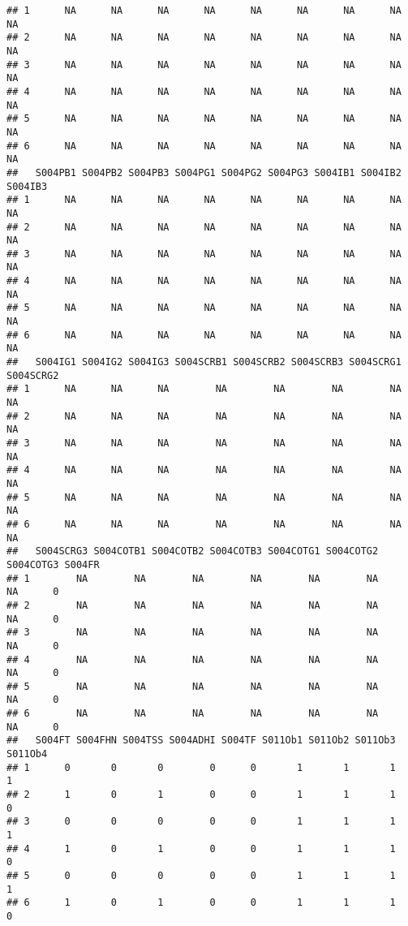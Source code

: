 \documentclass[
]{article}
\begin{document}
\begin{verbatim}
## 1      NA      NA      NA      NA      NA      NA      NA      NA      NA
## 2      NA      NA      NA      NA      NA      NA      NA      NA      NA
## 3      NA      NA      NA      NA      NA      NA      NA      NA      NA
## 4      NA      NA      NA      NA      NA      NA      NA      NA      NA
## 5      NA      NA      NA      NA      NA      NA      NA      NA      NA
## 6      NA      NA      NA      NA      NA      NA      NA      NA      NA
##   S004PB1 S004PB2 S004PB3 S004PG1 S004PG2 S004PG3 S004IB1 S004IB2 S004IB3
## 1      NA      NA      NA      NA      NA      NA      NA      NA      NA
## 2      NA      NA      NA      NA      NA      NA      NA      NA      NA
## 3      NA      NA      NA      NA      NA      NA      NA      NA      NA
## 4      NA      NA      NA      NA      NA      NA      NA      NA      NA
## 5      NA      NA      NA      NA      NA      NA      NA      NA      NA
## 6      NA      NA      NA      NA      NA      NA      NA      NA      NA
##   S004IG1 S004IG2 S004IG3 S004SCRB1 S004SCRB2 S004SCRB3 S004SCRG1 S004SCRG2
## 1      NA      NA      NA        NA        NA        NA        NA        NA
## 2      NA      NA      NA        NA        NA        NA        NA        NA
## 3      NA      NA      NA        NA        NA        NA        NA        NA
## 4      NA      NA      NA        NA        NA        NA        NA        NA
## 5      NA      NA      NA        NA        NA        NA        NA        NA
## 6      NA      NA      NA        NA        NA        NA        NA        NA
##   S004SCRG3 S004COTB1 S004COTB2 S004COTB3 S004COTG1 S004COTG2 S004COTG3 S004FR
## 1        NA        NA        NA        NA        NA        NA        NA      0
## 2        NA        NA        NA        NA        NA        NA        NA      0
## 3        NA        NA        NA        NA        NA        NA        NA      0
## 4        NA        NA        NA        NA        NA        NA        NA      0
## 5        NA        NA        NA        NA        NA        NA        NA      0
## 6        NA        NA        NA        NA        NA        NA        NA      0
##   S004FT S004FHN S004TSS S004ADHI S004TF S011Ob1 S011Ob2 S011Ob3 S011Ob4
## 1      0       0       0        0      0       1       1       1       1
## 2      1       0       1        0      0       1       1       1       0
## 3      0       0       0        0      0       1       1       1       1
## 4      1       0       1        0      0       1       1       1       0
## 5      0       0       0        0      0       1       1       1       1
## 6      1       0       1        0      0       1       1       1       0

\end{verbatim}
\end{document}
